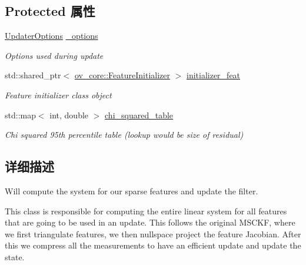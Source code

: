 \subsection*{Protected 属性}
\begin{DoxyCompactItemize}
\item 
\mbox{\label{classov__msckf_1_1UpdaterMSCKF_ab82434d9a42bbbf4a19dd049e8187c9d}} 
\hyperlink{structov__msckf_1_1UpdaterOptions}{Updater\+Options} \hyperlink{classov__msckf_1_1UpdaterMSCKF_ab82434d9a42bbbf4a19dd049e8187c9d}{\+\_\+options}
\begin{DoxyCompactList}\small\item\em Options used during update \end{DoxyCompactList}\item 
\mbox{\label{classov__msckf_1_1UpdaterMSCKF_a828b58318b6a4fcbf0f18ca37371e997}} 
std\+::shared\+\_\+ptr$<$ \hyperlink{classov__core_1_1FeatureInitializer}{ov\+\_\+core\+::\+Feature\+Initializer} $>$ \hyperlink{classov__msckf_1_1UpdaterMSCKF_a828b58318b6a4fcbf0f18ca37371e997}{initializer\+\_\+feat}
\begin{DoxyCompactList}\small\item\em Feature initializer class object \end{DoxyCompactList}\item 
\mbox{\label{classov__msckf_1_1UpdaterMSCKF_a1dec60a307dd3a6867c44b3af988603e}} 
std\+::map$<$ int, double $>$ \hyperlink{classov__msckf_1_1UpdaterMSCKF_a1dec60a307dd3a6867c44b3af988603e}{chi\+\_\+squared\+\_\+table}
\begin{DoxyCompactList}\small\item\em Chi squared 95th percentile table (lookup would be size of residual) \end{DoxyCompactList}\end{DoxyCompactItemize}


\subsection{详细描述}
Will compute the system for our sparse features and update the filter. 

This class is responsible for computing the entire linear system for all features that are going to be used in an update. This follows the original M\+S\+C\+KF, where we first triangulate features, we then nullspace project the feature Jacobian. After this we compress all the measurements to have an efficient update and update the state. 

